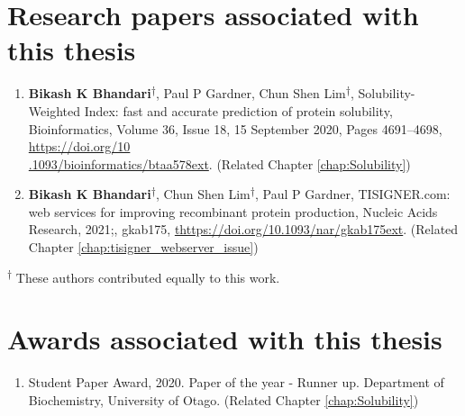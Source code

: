 \section*{Research papers associated with this thesis}
\begin{enumerate}
	\item \textbf{Bikash K Bhandari}\textsuperscript{$\dagger$}, Paul P Gardner, Chun Shen Lim\textsuperscript{$\dagger$}, Solubility-Weighted Index: fast and accurate prediction of protein solubility, Bioinformatics, Volume 36, Issue 18, 15 September 2020, Pages 4691–4698, \href{https://doi.org/10.1093/bioinformatics/btaa578}{https://doi.org/10\\.1093/bioinformatics/btaa578ext}. (Related Chapter \ref{chap:Solubility})
	
	
	\item \textbf{Bikash K Bhandari}\textsuperscript{$\dagger$}, Chun Shen Lim\textsuperscript{$\dagger$}, Paul P Gardner, TISIGNER.com: web services for improving recombinant protein production, Nucleic Acids Research, 2021;, gkab175, \href{https://doi.org/10.1093/nar/gkab175}{thttps://doi.org/10.1093/nar/gkab175ext}. (Related Chapter \ref{chap:tisigner_webserver_issue})
	
\end{enumerate}

\textsuperscript{$\dagger$} These authors contributed equally to this work.



\section*{Awards associated with this thesis}
\begin{enumerate}
	\item Student Paper Award, 2020. Paper of the year - Runner up. Department of Biochemistry, University of Otago. (Related Chapter \ref{chap:Solubility})

\end{enumerate}